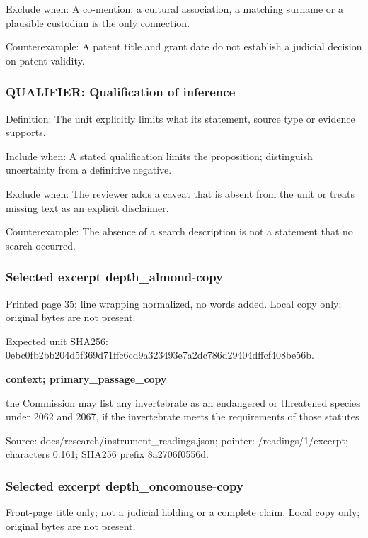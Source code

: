 \documentclass[
  english,
]{article}
\begin{document}
Exclude when: A co-mention, a cultural association, a matching surname
or a plausible custodian is the only connection.

Counterexample: A patent title and grant date do not establish a
judicial decision on patent validity.

\subsubsection{QUALIFIER: Qualification of
inference}\label{qualifier-qualification-of-inference}

Definition: The unit explicitly limits what its statement, source type
or evidence supports.

Include when: A stated qualification limits the proposition; distinguish
uncertainty from a definitive negative.

Exclude when: The reviewer adds a caveat that is absent from the unit or
treats missing text as an explicit disclaimer.

Counterexample: The absence of a search description is not a statement
that no search occurred.

\subsubsection{Selected excerpt
depth\_almond-copy}\label{selected-excerpt-depth_almond-copy}

Printed page 35; line wrapping normalized, no words added. Local copy
only; original bytes are not present.

Expected unit SHA256:
0ebc0fb2bb204d5f369d71ffc6cd9a323493e7a2dc786d29404dffcf408be56b.

\textbf{context; primary\_passage\_copy}

the Commission may list any invertebrate as an endangered or threatened
species under 2062 and 2067, if the invertebrate meets the requirements
of those statutes

Source: docs/research/instrument\_readings.json; pointer:
/readings/1/excerpt; characters 0:161; SHA256 prefix 8a2706f0556d.

\subsubsection{Selected excerpt
depth\_oncomouse-copy}\label{selected-excerpt-depth_oncomouse-copy}

Front-page title only; not a judicial holding or a complete claim. Local
copy only; original bytes are not present.
\end{document}
